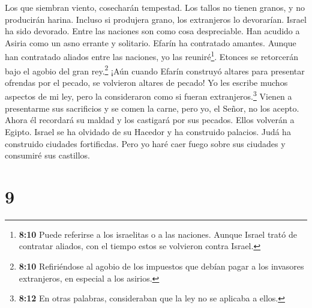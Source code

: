  Los que siembran viento, cosecharán tempestad. Los tallos
no tienen granos, y no producirán harina. Incluso si produjera grano,
los extranjeros lo devorarían.  Israel ha sido devorado.
Entre las naciones son como cosa despreciable.  Han acudido
a Asiria como un asno errante y solitario. Efarín ha contratado amantes.
 Aunque han contratado aliados entre las naciones, yo las
reuniré\footnote{\textbf{8:10} Puede referirse a los israelitas o a las
  naciones. Aunque Israel trató de contratar aliados, con el tiempo
  estos se volvieron contra Israel.}. Etonces se retorcerán bajo el
agobio del gran rey.\footnote{\textbf{8:10} Refiriéndose al agobio de
  los impuestos que debían pagar a los invasores extranjeros, en
  especial a los asirios.}  ¡Aún cuando Efarín construyó
altares para presentar ofrendas por el pecado, se volvieron altares de
pecado!  Yo les escribe muchos aspectos de mi ley, pero la
consideraron como si fueran extranjeros.\footnote{\textbf{8:12} En otras
  palabras, consideraban que la ley no se aplicaba a ellos.}
 Vienen a presentarme sus sacrificios y se comen la carne,
pero yo, el Señor, no los acepto. Ahora él recordará su maldad y los
castigará por sus pecados. Ellos volverán a Egipto.  Israel
se ha olvidado de su Hacedor y ha construido palacios. Judá ha
construido ciudades fortificdas. Pero yo haré caer fuego sobre sus
ciudades y consumiré sus castillos.

\hypertarget{section-8}{%
\section{9}\label{section-8}}

